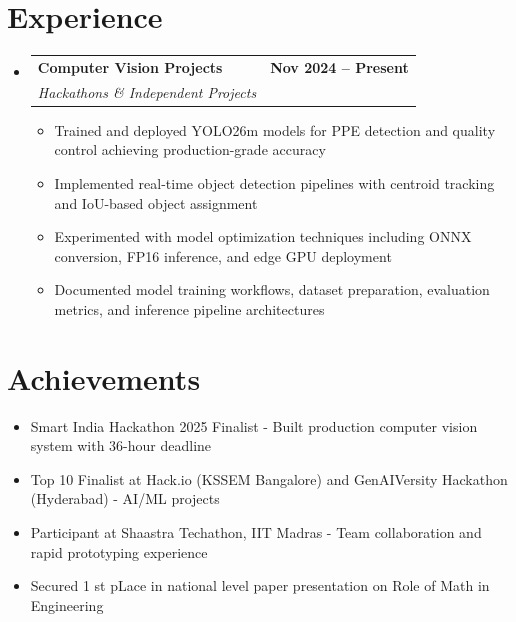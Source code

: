 \documentclass[letterpaper,11pt]{article}
\makeatletter
\newcommand{\resumeItem}[1]{
  \item\small{
    {#1 \vspace{-2pt}}
  }
}
\newcommand{\resumeSubheading}[4]{
  \vspace{-2pt}\item
    \begin{tabular*}{1.0\textwidth}[t]{l@{\extracolsep{\fill}}r}
      \textbf{#1} & \textbf{\small #2} \\
      \textit{\small#3} & \textit{\small #4} \\
    \end{tabular*}\vspace{-7pt}
}
\newcommand{\resumeSubHeadingListStart}{\begin{itemize}[leftmargin=0.0in, label={}]}
\newcommand{\resumeSubHeadingListEnd}{\end{itemize}}
\newcommand{\resumeItemListStart}{\begin{itemize}}
\newcommand{\resumeItemListEnd}{\end{itemize}\vspace{-5pt}}
\makeatother
\begin{document}
\section{Experience}
  \resumeSubHeadingListStart
    \resumeSubheading
      {Computer Vision Projects}{Nov 2024 -- Present}
      {Hackathons \& Independent Projects}{}
      \resumeItemListStart
        \resumeItem{Trained and deployed YOLO26m models for PPE detection and quality control achieving production-grade accuracy}
        \resumeItem{Implemented real-time object detection pipelines with centroid tracking and IoU-based object assignment}
        \resumeItem{Experimented with model optimization techniques including ONNX conversion, FP16 inference, and edge GPU deployment}
        \resumeItem{Documented model training workflows, dataset preparation, evaluation metrics, and inference pipeline architectures}
      \resumeItemListEnd
  \resumeSubHeadingListEnd

\section{Achievements}
\resumeItemListStart
  \resumeItem{Smart India Hackathon 2025 Finalist - Built production computer vision system with 36-hour deadline}
  \resumeItem{Top 10 Finalist at Hack.io (KSSEM Bangalore) and GenAIVersity Hackathon (Hyderabad) - AI/ML projects}
  \resumeItem{Participant at Shaastra Techathon, IIT Madras - Team collaboration and rapid prototyping experience}
  \resumeItem{Secured 1 st pLace in national level paper presentation on Role of Math in Engineering}
\resumeItemListEnd
\end{document}
